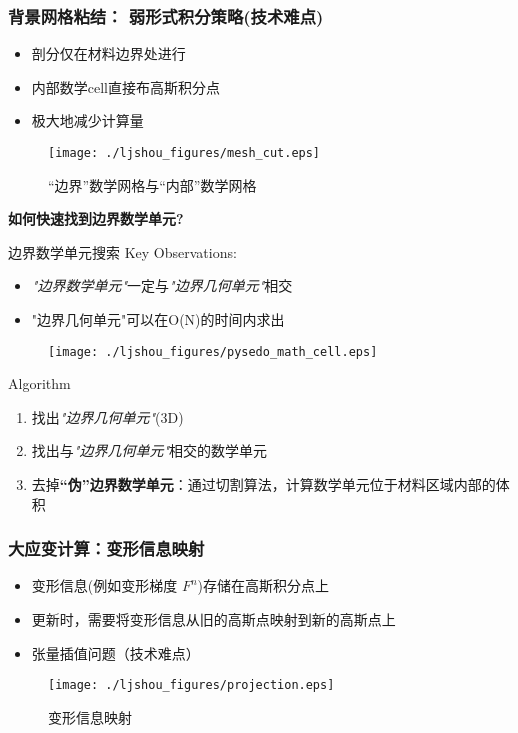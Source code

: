 \documentclass[mathserif]{beamer}
\begin{document}
\begin{CJK}{UTF8}{gkai}
\begin{frame}
	\frametitle{背景网格粘结： 弱形式积分策略(技术难点)}
	\begin{itemize}
		\item 剖分仅在材料边界处进行
		\item 内部数学cell直接布高斯积分点
  				\item 极大地减少计算量
	\end{itemize}
	\begin{figure}
			\centering
	    	\texttt{[image: ./ljshou\_figures/mesh\_cut.eps]}
			\caption{“边界”数学网格与“内部”数学网格}
	\end{figure}
	\begin{block}{}
		\bf \color{blue} 如何快速找到边界数学单元?
	\end{block}
\end{frame}
        
        \begin{frame}{边界数学单元搜索}
            Key Observations:
            	\small
                \begin{itemize}
                \item \textit{"边界数学单元"}一定与\emph{"边界几何单元"}相交
                \item "边界几何单元"可以在O(N)的时间内求出
                \end{itemize}
        		\begin{figure}
		\centering
	   	\texttt{[image: ./ljshou\_figures/pysedo\_math\_cell.eps]}
	\end{figure}
	\begin{block}{Algorithm}
		\small
                \begin{enumerate}
                \item 找出\emph{"边界几何单元"}(3D)
                \item 找出与\emph{"边界几何单元"}相交的数学单元
                \item 去掉{\bf“伪”边界数学单元}：通过切割算法，计算数学单元位于材料区域内部的体积
                \end{enumerate}
            \end{block}
        \end{frame}
        
		
\begin{frame}
	\frametitle{大应变计算：变形信息映射}
	\begin{itemize}
		\item 变形信息(例如变形梯度 $F^n$)存储在高斯积分点上
		\item 更新时，需要将变形信息从旧的高斯点映射到新的高斯点上
		\item 张量插值问题（技术难点）
	\end{itemize}
        	\begin{figure}
        		\centering
        		\texttt{[image: ./ljshou\_figures/projection.eps]}
        		\caption{变形信息映射}
        	\end{figure}
\end{frame}	
	

\end{CJK}
\end{document}
